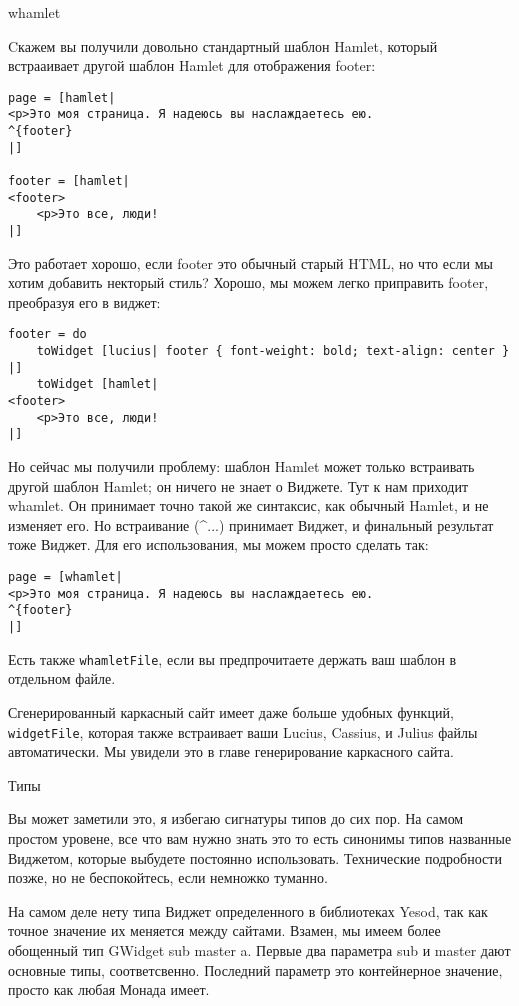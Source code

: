 whamlet

Cкажем вы получили довольно стандартный шаблон Hamlet, который встрааивает другой шаблон Hamlet для отображения footer:

\begin{lstlisting}
page = [hamlet|
<p>Это моя страница. Я надеюсь вы наслаждаетесь ею.
^{footer}
|]

footer = [hamlet|
<footer>
    <p>Это все, люди!
|]
\end{lstlisting}

Это работает хорошо, если footer это обычный старый HTML, но что если мы хотим добавить некторый стиль? Хорошо, мы можем легко приправить footer, преобразуя его в виджет:

\begin{lstlisting}
footer = do
    toWidget [lucius| footer { font-weight: bold; text-align: center } |]
    toWidget [hamlet|
<footer>
    <p>Это все, люди!
|]
\end{lstlisting}

Но сейчас мы получили проблему: шаблон Hamlet может только встраивать другой шаблон Hamlet; он ничего не знает о Виджете. Тут к нам приходит whamlet. Он принимает точно такой же синтаксис, как обычный Hamlet, и не изменяет его. Но встраивание (^{...}) принимает Виджет, и финальный результат тоже Виджет. Для его использования, мы можем просто сделать так:

\begin{lstlisting}
page = [whamlet|
<p>Это моя страница. Я надеюсь вы наслаждаетесь ею.
^{footer}
|]
\end{lstlisting}


Есть также \lstinline'whamletFile', если вы предпрочитаете держать ваш шаблон в отдельном файле.

Сгенерированный каркасный сайт имеет даже больше удобных функций, \lstinline'widgetFile', которая также встраивает ваши Lucius, Cassius, и Julius файлы автоматически. Мы увидели это в главе генерирование каркасного сайта. %

Типы

Вы может заметили это, я избегаю сигнатуры типов до сих пор. На самом простом уровене, все что вам нужно знать это то есть синонимы типов названные Виджетом, которые выбудете постоянно использовать. Технические подробности позже, но не беспокойтесь, если немножко туманно.

На самом деле нету типа Виджет определенного в библиотеках Yesod, так как точное значение их меняется между сайтами. Взамен, мы имеем более обощенный тип GWidget sub master a. Первые два параметра sub и master дают основные типы, соответсвенно. Последний параметр это контейнерное значение, просто как любая Монада имеет.

